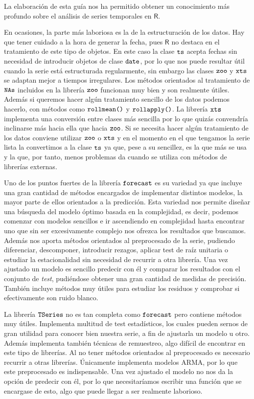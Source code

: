 
La elaboración de esta guía nos ha permitido obtener un conocimiento más profundo sobre el análisis de series temporales en $\textsf{R}$.

En ocasiones, la parte más laboriosa es la de la estructuración de los datos. Hay que tener cuidado a la hora de generar la fecha, pues $\textsf{R}$ no destaca en el tratamiento de este tipo de objetos. En este caso la clase $\verb!ts!$ acepta fechas sin necesidad de introducir objetos de clase $\verb!date!$, por lo que nos puede resultar útil cuando la serie está estructurada regularmente, sin embargo las clases $\verb!zoo!$ y $\verb!xts!$ se adaptan mejor a tiempos irregulares. Los métodos orientados al tratamiento de $\verb!NAs!$ incluidos en la librería $\verb!zoo!$ funcionan muy bien y son realmente útiles. Además si queremos hacer algún tratamiento sencillo de los datos podemos hacerlo, con métodos como $\verb!rollmean()!$ y $\verb!rollapply()!$. La librería $\verb!xts!$ implementa una conversión entre clases más sencilla por lo que quizás convendría inclinarse más hacia ella que hacia $\verb!zoo!$. Si se necesita hacer algún tratamiento de los datos conviene utilizar $\verb!zoo!$ o $\verb!xts!$ y en el momento en el que tengamos la serie lista la convertimos a la clase $\verb!ts!$ ya que, pese a su sencillez, es la que más se usa y la que, por tanto, menos problemas da cuando se utiliza con métodos de librerías externas.

Uno de los puntos fuertes de la librería $\verb!forecast!$ es su variedad ya que incluye una gran cantidad de métodos encargados de implementar distintos modelos, la mayor parte de ellos orientados a la predicción. Esta variedad nos permite diseñar una búsqueda del modelo óptimo basada en la complejidad, es decir, podemos comenzar con modelos sencillos e ir ascendiendo en complejidad hasta encontrar uno que sin ser excesivamente complejo nos ofrezca los resultados que buscamos. Además nos aporta métodos orientados al preprocesado de la serie, pudiendo diferenciar, descomponer, introducir rezagos, aplicar test de raíz unitaria o estudiar la estacionalidad sin necesidad de recurrir a otra librería. Una vez ajustado un modelo es sencillo predecir con él y comparar los resultados con el conjunto de \textit{test}, pudiéndose obtener una gran cantidad de medidas de precisión. También incluye métodos muy útiles para estudiar los residuos y comprobar si efectivamente son ruido blanco.

La librería $\verb!TSeries!$ no es tan completa como $\verb!forecast!$ pero contiene métodos muy útiles. Implementa multitud de test estadísticos, los cuales pueden sernos de gran utilidad para conocer bien nuestra serie, a fin de ajustarla un modelo u otro. Además implementa también técnicas de remuestreo, algo difícil de encontrar en este tipo de librerías. Al no tener métodos orientados al preprocesado es necesario recurrir a otras librerías. Únicamente implementa modelos ARMA, por lo que este preprocesado es indispensable. Una vez ajustado el modelo no nos da la opción de predecir con él, por lo que necesitaríamos escribir una función que se encargase de esto, algo que puede llegar a ser realmente laborioso.

